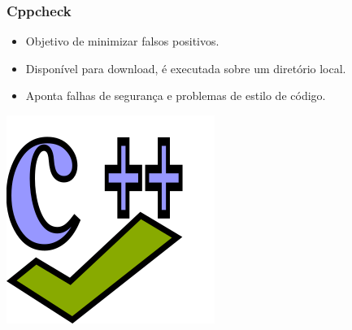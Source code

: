 \documentclass{beamer}
\begin{document}
\begin{frame}
  \frametitle{Cppcheck}

  \begin{minipage}{0.5\textwidth}\centering
    \begin{itemize}
      \item Objetivo de minimizar falsos positivos.
      \item Disponível para download, é executada sobre um diretório local.
      \item Aponta falhas de segurança e problemas de estilo de código.
    \end{itemize}
  \end{minipage}
  \hfill
  \begin{minipage}{0.4\textwidth}\raggedleft

  \includegraphics[scale=0.33]{img/cppcheck.png}

  \end{minipage}

\end{frame}
\end{document}
